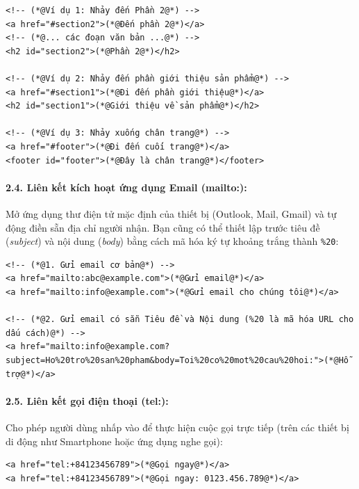 \documentclass[11pt,oneside]{book}
\newcommand{\codeinline}[1]{\textcolor{accentOrange}{\texttt{#1}}}
\begin{document}
\begin{codeWindow}
\begin{lstlisting}[language=HTML5]
<!-- (*@Ví dụ 1: Nhảy đến Phần 2@*) -->
<a href="#section2">(*@Đến phần 2@*)</a>
<!-- (*@... các đoạn văn bản ...@*) -->
<h2 id="section2">(*@Phần 2@*)</h2>

<!-- (*@Ví dụ 2: Nhảy đến phần giới thiệu sản phẩm@*) -->
<a href="#section1">(*@Đi đến phần giới thiệu@*)</a>
<h2 id="section1">(*@Giới thiệu về sản phẩm@*)</h2>

<!-- (*@Ví dụ 3: Nhảy xuống chân trang@*) -->
<a href="#footer">(*@Đi đến cuối trang@*)</a>
<footer id="footer">(*@Đây là chân trang@*)</footer>
\end{lstlisting}
\end{codeWindow}

\paragraph{2.4. Liên kết kích hoạt ứng dụng Email (mailto:):}
Mở ứng dụng thư điện tử mặc định của thiết bị (Outlook, Mail, Gmail) và tự động điền sẵn địa chỉ người nhận. Bạn cũng có thể thiết lập trước tiêu đề (\textit{subject}) và nội dung (\textit{body}) bằng cách mã hóa ký tự khoảng trắng thành \codeinline{\%20}:

\begin{codeWindow}
\begin{lstlisting}[language=HTML5]
<!-- (*@1. Gửi email cơ bản@*) -->
<a href="mailto:abc@example.com">(*@Gửi email@*)</a>
<a href="mailto:info@example.com">(*@Gửi email cho chúng tôi@*)</a>

<!-- (*@2. Gửi email có sẵn Tiêu đề và Nội dung (%20 là mã hóa URL cho dấu cách)@*) -->
<a href="mailto:info@example.com?subject=Ho%20tro%20san%20pham&body=Toi%20co%20mot%20cau%20hoi:">(*@Hỗ trợ@*)</a>
\end{lstlisting}
\end{codeWindow}

\paragraph{2.5. Liên kết gọi điện thoại (tel:):}
Cho phép người dùng nhấp vào để thực hiện cuộc gọi trực tiếp (trên các thiết bị di động như Smartphone hoặc ứng dụng nghe gọi):

\begin{codeWindow}
\begin{lstlisting}[language=HTML5]
<a href="tel:+84123456789">(*@Gọi ngay@*)</a>
<a href="tel:+84123456789">(*@Gọi ngay: 0123.456.789@*)</a>
\end{lstlisting}
\end{codeWindow}
\end{document}
